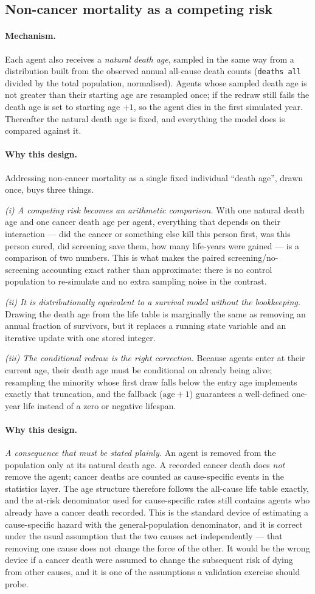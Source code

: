 \documentclass[12pt,a4paper]{article}
\newcommand{\id}[1]{\texttt{#1}}
\newcommand{\mech}[1]{\paragraph{Mechanism.} #1}
\newcommand{\why}[1]{\paragraph{Why this design.} #1}
\begin{document}
\subsection{Non-cancer mortality as a competing risk}

\mech{Each agent also receives a \emph{natural death age}, sampled in the same way from a distribution
built from the observed annual all-cause death counts (\id{deaths all} divided by the total population,
normalised). Agents whose sampled death age is not greater than their starting age are resampled once; if
the redraw still fails the death age is set to starting age $+1$, so the agent dies in the first simulated
year. Thereafter the natural death age is fixed, and everything the model does is compared against it.}

\why{Addressing non-cancer mortality as a single fixed individual ``death age'', drawn once, buys three
things.

\emph{(i) A competing risk becomes an arithmetic comparison.} With one natural death age and one cancer
death age per agent, everything that depends on their interaction --- did the cancer or something else kill
this person first, was this person cured, did screening save them, how many life-years were gained --- is a
comparison of two numbers. This is what makes the paired screening/no-screening accounting exact rather
than approximate: there is no control population to re-simulate and no extra sampling noise in the
contrast.

\emph{(ii) It is distributionally equivalent to a survival model without the bookkeeping.} Drawing the
death age from the life table is marginally the same as removing an annual fraction of survivors, but it
replaces a running state variable and an iterative update with one stored integer.

\emph{(iii) The conditional redraw is the right correction.} Because agents enter at their current age,
their death age must be conditional on already being alive; resampling the minority whose first draw falls
below the entry age implements exactly that truncation, and the fallback ($\text{age}+1$) guarantees a
well-defined one-year life instead of a zero or negative lifespan.}

\why{\emph{A consequence that must be stated plainly.} An agent is removed from the population only at its
natural death age. A recorded cancer death does \emph{not} remove the agent; cancer deaths are counted as
cause-specific events in the statistics layer. The age structure therefore follows the all-cause life table
exactly, and the at-risk denominator used for cause-specific rates still contains agents who already have a
cancer death recorded. This is the standard device of estimating a cause-specific hazard with the
general-population denominator, and it is correct under the usual assumption that the two causes act
independently --- that removing one cause does not change the force of the other. It would be the wrong
device if a cancer death were assumed to change the subsequent risk of dying from other causes, and it is
one of the assumptions a validation exercise should probe.}
\end{document}
